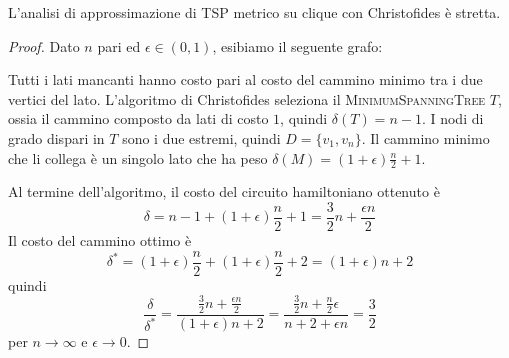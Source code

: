\begin{theorem}
	L'analisi di approssimazione  di TSP metrico su clique con Christofides è stretta.
\end{theorem}
\begin{proof}
	Dato $n$ pari ed $\epsilon \in (0,1)$, esibiamo il seguente grafo:

	\begin{figure}[h]
		\centering
	\end{figure}
	Tutti i lati mancanti hanno costo pari al costo del cammino minimo tra i due vertici del lato.
	L'algoritmo di Christofides seleziona il \textsc{MinimumSpanningTree} $T$, ossia il cammino composto da
	lati di costo $1$, quindi $\delta(T) = n - 1$. I nodi di grado dispari in $T$ sono
	i due estremi, quindi $D = \{v_1, v_n\}$. Il cammino minimo che li collega è
	un singolo lato che ha peso $\delta(M) = (1 + \epsilon) \frac{n}{2} + 1$.

	Al termine dell'algoritmo, il costo del circuito hamiltoniano ottenuto è
	$$
		\delta = n - 1 +  (1 + \epsilon) \frac{n}{2} + 1 = \frac{3}{2}n + \frac{\epsilon n}{2}
	$$
	Il costo del cammino ottimo è
	$$
		\delta^* = (1 + \epsilon) \frac{n}{2} + (1 + \epsilon) \frac{n}{2} +2 = (1 + \epsilon) n + 2
	$$
	quindi
	$$
		\frac{\delta}{\delta^*} = \frac{\frac{3}{2}n + \frac{\epsilon n}{2}}{(1 + \epsilon)n +2}
		= \frac{\frac{3}{2} n + \frac{n}{2}\epsilon}{n + 2 + \epsilon n} = \frac{3}{2}
	$$
	per $n \rightarrow \infty$ e $\epsilon \rightarrow 0$.
\end{proof}

